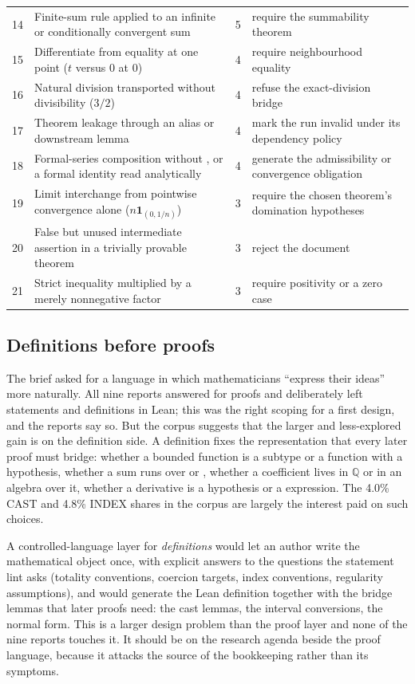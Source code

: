 \documentclass[11pt,a4paper]{article}
\newcommand{\code}[1]{\texttt{\detokenize{#1}}}
\theoremstyle{definition}
\begin{document}
\begin{longtable}{@{}L{.04\textwidth}L{.45\textwidth}L{.08\textwidth}L{.37\textwidth}@{}}
14 & Finite-sum rule applied to an infinite or conditionally convergent sum & 5 & require the summability theorem\\
15 & Differentiate from equality at one point ($t$ versus $0$ at $0$) & 4 & require neighbourhood equality\\
16 & Natural division transported without divisibility ($3/2$) & 4 & refuse the exact-division bridge\\
17 & Theorem leakage through an alias or downstream lemma & 4 & mark the run invalid under its dependency policy\\
18 & Formal-series composition without \code{HasSubst}, or a formal identity read analytically & 4 & generate the admissibility or convergence obligation\\
19 & Limit interchange from pointwise convergence alone ($n\mathbf{1}_{(0,1/n)}$) & 3 & require the chosen theorem's domination hypotheses\\
20 & False but unused intermediate assertion in a trivially provable theorem & 3 & reject the document\\
21 & Strict inequality multiplied by a merely nonnegative factor & 3 & require positivity or a zero case\\
\bottomrule
\end{longtable}
\endgroup

\subsection{Definitions before proofs}
\label{sec:definitions}
The brief asked for a language in which mathematicians ``express their ideas'' more naturally. All nine reports answered for proofs and deliberately left statements and definitions in Lean; this was the right scoping for a first design, and the reports say so. But the corpus suggests that the larger and less-explored gain is on the definition side. A definition fixes the representation that every later proof must bridge: whether a bounded function is a subtype or a function with a hypothesis, whether a sum runs over \code{range (n+1)} or \code{Icc 0 n}, whether a coefficient lives in $\mathbb{Q}$ or in an algebra over it, whether a derivative is a hypothesis or a \code{deriv} expression. The 4.0\% CAST and 4.8\% INDEX shares in the corpus are largely the interest paid on such choices.

A controlled-language layer for \emph{definitions} would let an author write the mathematical object once, with explicit answers to the questions the statement lint asks (totality conventions, coercion targets, index conventions, regularity assumptions), and would generate the Lean definition together with the bridge lemmas that later proofs need: the cast lemmas, the interval conversions, the \code{simp} normal form. This is a larger design problem than the proof layer and none of the nine reports touches it. It should be on the research agenda beside the proof language, because it attacks the source of the bookkeeping rather than its symptoms.
\end{document}
